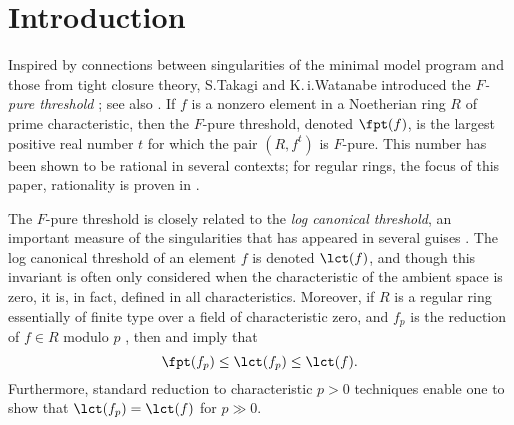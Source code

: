 \documentclass[11pt]{amsart}
\begin{document}
\address{
2844 East Hall,
Department of Mathematics,
University of Michigan,
530 Church Street,
Ann Arbor, MI 48109}

\address{
2844 East Hall,
Department of Mathematics,
University of Michigan,
530 Church Street,
Ann Arbor, MI 48109}

\address{
2844 East Hall,
Department of Mathematics,
University of Michigan,
530 Church Street,
Ann Arbor, MI 48109}

\address{
Department of Mathematical Sciences,
4400 University Drive, MS3 F2,
George Mason University,
Fairfax, Virginia, 22030
}


\maketitle

\section{Introduction}

Inspired by connections between singularities of the minimal model program and those from tight closure theory, S.\;Takagi and K.\,i.\;Watanabe introduced the \emph{$F$-pure threshold} \cite{TakagiWatanabeFPureThresh}; see also \cite{MustataTakagiWatanabeFThresholdsAndBernsteinSato}.
If $f$ is a nonzero element in a Noetherian ring $R$ of prime characteristic, then the $F$-pure threshold, denoted $\fpt(f)$, is the largest positive real number $t$ for which the pair $(R, f^t)$ is $F$-pure. 
This number has been shown to be rational in several contexts; for regular rings, the focus of this paper, rationality is proven in \cite{BlickleMustataSmithFThresholdsOfHypersurfaces}.

The $F$-pure threshold is closely related to the \emph{log canonical threshold}, an important measure of the singularities that
has appeared in several guises \cite[Sections 8-10]{KollarSingularitiesOfPairs}.  The log canonical threshold of an element $f$ is denoted $\lct(f)$, and though this invariant is often only considered when the characteristic of the ambient space is zero, it is, in fact, defined in all characteristics.
Moreover, if $R$ is a regular ring essentially of finite type over a field of characteristic zero, and $f_p$ is the reduction of $f \in R$ modulo $p$ \cite{HochsterHunekeTightClosureInEqualCharactersticZero},
then \cite{HaraWatanabeFRegFPure} and \cite[Corollary 4.1]{ZhuLCTPosChar}
imply that
\begin{equation} \label{inequalities: e}
\fpt(f_p) \leq \lct(f_p) \leq \lct(f).
\end{equation}
Furthermore, standard reduction to characteristic $p > 0$ techniques enable one to show that $\lct(f_p) = \lct(f)$ for $p \gg 0$.
\end{document}
